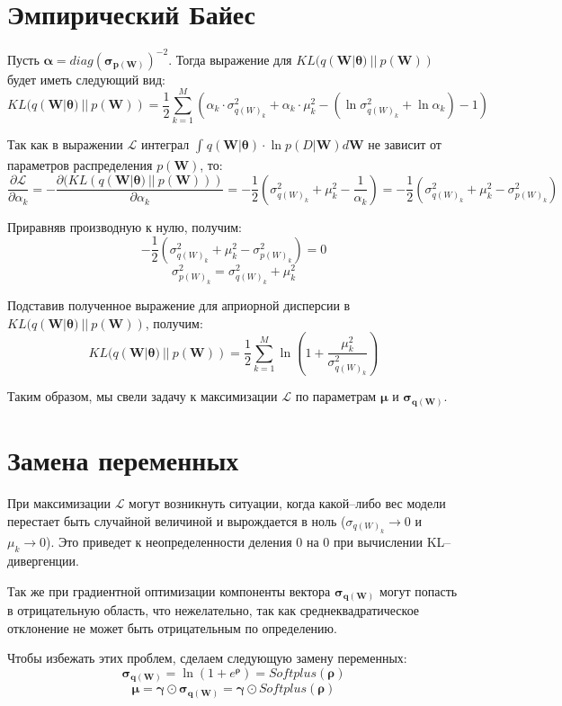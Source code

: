 \documentclass{article}
\begin{document}
\section{Эмпирический Байес}
Пусть $\pmb{\alpha} = diag(\pmb{\sigma_{p(\pmb{W})}})^{-2}$. Тогда выражение для $KL(q(\pmb{W} | \pmb{\theta})~||~p(\pmb{W}))$ будет иметь следующий вид:
\[
KL(q(\pmb{W} | \pmb{\theta})~||~p(\pmb{W})) =
\dfrac{1}{2}\sum_{k=1}^{M}( \alpha_{k} \cdot \sigma_{{q(W)_{k}}}^2 + \alpha_{k} \cdot \mu_{k}^2 - (\ln{\sigma_{{q(W)_{k}}}^2} + \ln{\alpha_{k}}) - 1)
\]

Так как в выражении $\mathcal{L}$ интеграл $\int_{}{} q(\pmb{W} | \pmb{\theta}) \cdot \ln{p(D | \pmb{W})} d \pmb{W}$ не зависит от параметров распределения $p(\pmb{W})$, то:
\[
\dfrac{\partial \mathcal{L}}{\partial {\alpha_k}} =
- \dfrac{\partial (KL(q(\pmb{W} | \pmb{\theta})~||~p(\pmb{W})))}{\partial {\alpha_k}} =
-\dfrac{1}{2}(\sigma_{{q(W)_{k}}}^2 + \mu_{k}^2 - \dfrac{1}{\alpha_k}) =
-\dfrac{1}{2}(\sigma_{{q(W)_{k}}}^2 + \mu_{k}^2 - \sigma_{{p(W)_{k}}}^2)
\]

Приравняв производную к нулю, получим:
\[
-\dfrac{1}{2}(\sigma_{{q(W)_{k}}}^2 + \mu_{k}^2 - \sigma_{{p(W)_{k}}}^2) = 0
\]\[
\sigma_{{p(W)_{k}}}^2 = \sigma_{{q(W)_{k}}}^2 + \mu_{k}^2
\]

Подставив полученное выражение для априорной дисперсии в $KL(q(\pmb{W} | \pmb{\theta})~||~p(\pmb{W}))$, получим:
\[
KL(q(\pmb{W} | \pmb{\theta})~||~p(\pmb{W})) =
\dfrac{1}{2}\sum_{k=1}^{M}\ln({1 + \dfrac{\mu_{k}^2}{\sigma_{{q(W)_{k}}}^2}})
\]

Таким образом, мы свели задачу к максимизации $\mathcal{L}$ по параметрам $\pmb{\mu}$ и $\pmb{\sigma_{q(W)}}$.

\section{Замена переменных}

При максимизации $\mathcal{L}$ могут возникнуть ситуации, когда какой--либо вес модели перестает быть случайной величиной и вырождается в ноль ($\sigma_{{q(W)_{k}}} \rightarrow 0$ и $\mu_{k} \rightarrow 0$). Это приведет к неопределенности деления 0 на 0 при вычислении KL--дивергенции.

Так же при градиентной оптимизации компоненты вектора $\pmb{\sigma_{q(\pmb{W})}}$ могут попасть в отрицательную область, что нежелательно, так как среднеквадратическое отклонение не может быть отрицательным по определению.

Чтобы избежать этих проблем, сделаем следующую замену переменных:
\[
 \pmb{\sigma_{q(\pmb{W})}} = \ln({1 + e^{\pmb{\rho}}}) = Softplus (\pmb{\rho})
\]\[
 \pmb{\mu} = \pmb{\gamma} \odot \pmb{\sigma_{q(\pmb{W})}} = \pmb{\gamma} \odot Softplus (\pmb{\rho})
\]
\end{document}
